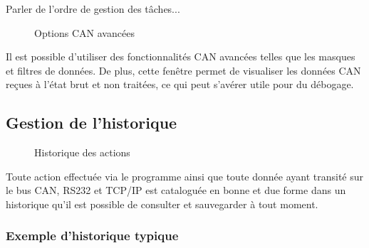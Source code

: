 \documentclass[10pt,a4paper,final]{article}
\begin{document}
\begin{spacing}{1.5}
\bigskip
 Parler de l'ordre de gestion des tâches...
\vfill
\pagebreak


\begin{figure}[hbtp]
\caption{Options CAN avancées}
\centering
{}
\end{figure}
Il est possible d'utiliser des fonctionnalités CAN avancées telles que les masques et filtres de données. De plus, cette fenêtre permet de visualiser les données CAN reçues à l'état brut et non traitées, ce qui peut s'avérer utile pour du débogage.\pagebreak

\subsection{Gestion de l'historique}
\begin{figure}[hbtp]
\caption{Historique des actions}
\centering
{}
\end{figure}
Toute action effectuée via le programme ainsi que toute donnée ayant transité sur le bus CAN, RS232 et TCP/IP est cataloguée en bonne et due forme dans un historique qu'il est possible de consulter et sauvegarder à tout moment.

\subsubsection{Exemple d'historique typique}
\end{spacing}
\end{document}
